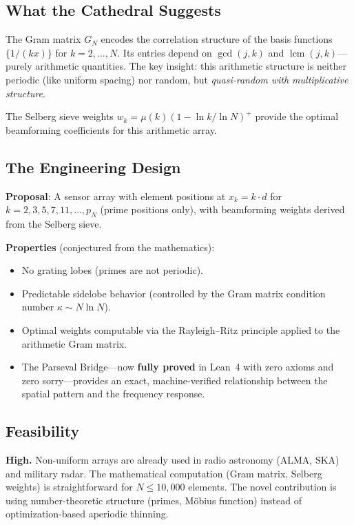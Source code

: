 \documentclass[11pt,a4paper]{article}
\begin{document}
\subsection{What the Cathedral Suggests}

The Gram matrix $G_N$ encodes the correlation structure of the basis
functions $\{1/(kx)\}$ for $k = 2, \ldots, N$. Its entries depend
on $\gcd(j,k)$ and $\operatorname{lcm}(j,k)$---purely arithmetic
quantities. The key insight: this arithmetic structure is neither
periodic (like uniform spacing) nor random, but \emph{quasi-random
with multiplicative structure}.

The Selberg sieve weights $w_k = \mu(k)(1 - \ln k / \ln N)^+$
provide the optimal beamforming coefficients for this arithmetic
array.

\subsection{The Engineering Design}

\textbf{Proposal}: A sensor array with element positions at
$x_k = k \cdot d$ for $k = 2, 3, 5, 7, 11, \ldots, p_N$ (prime
positions only), with beamforming weights derived from the Selberg
sieve.

\textbf{Properties} (conjectured from the mathematics):
\begin{itemize}
  \item No grating lobes (primes are not periodic).
  \item Predictable sidelobe behavior (controlled by the Gram
    matrix condition number $\kappa \sim N \ln N$).
  \item Optimal weights computable via the Rayleigh--Ritz principle
    applied to the arithmetic Gram matrix.
  \item The Parseval Bridge---now \textbf{fully proved} in Lean~4
    with zero axioms and zero sorry---provides an exact, machine-verified
    relationship between the spatial pattern and the frequency response.
\end{itemize}

\subsection{Feasibility}

\textbf{High.} Non-uniform arrays are already used in radio
astronomy (ALMA, SKA) and military radar. The mathematical
computation (Gram matrix, Selberg weights) is straightforward for
$N \leq 10{,}000$ elements. The novel contribution is using
number-theoretic structure (primes, M\"obius function) instead of
optimization-based aperiodic thinning.
\end{document}
